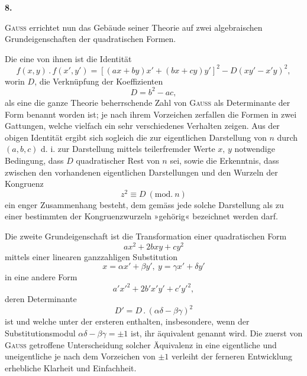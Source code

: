 \begin{center}\bfseries 8.\end{center}
\noindent\hspace*{\parindent}\textsc{Gauss} errichtet nun das Gebäude seiner Theorie auf zwei algebraischen Grundeigenschaften der quadratischen Formen.

Die eine von ihnen ist die Identität
\[
f(x,y)\mathbin{.}f(x',y')=[(ax+by)x'+(bx+cy)y']^2-D(xy'-x'y)^2,
\]
worin \(D\), die Verknüpfung der Koeffizienten
\[
D=b^2-ac,
\]
als eine die ganze Theorie beherrschende Zahl von \textsc{Gauss} als Determinante der Form benannt worden ist; je nach ihrem Vorzeichen zerfallen die Formen in zwei Gattungen, welche vielfach ein sehr verschiedenes Verhalten zeigen.
\newpage{}
\noindent Aus der obigen Identität ergibt sich sogleich die zur eigentlichen Darstellung von \(n\) durch \((a,b,c)\) d. i. zur Darstellung mittels teilerfremder Werte \(x,\,y\) notwendige Bedingung, dass \(D\) quadratischer Rest von \(n\) sei, sowie die Erkenntnis, dass zwischen den vorhandenen eigentlichen Darstellungen und den Wurzeln der Kongruenz
\[
z^2\equiv D\ (\mathrm{mod.}\ n)
\]
ein enger Zusammenhang besteht, dem gemäss jede solche Darstellung als zu einer bestimmten der Kongruenzwurzeln »gehörig« bezeichnet werden darf.

Die zweite Grundeigenschaft ist die Transformation einer quadratischen Form
\[
ax^2+2bxy+cy^2
\]
mittels einer linearen ganzzahligen Substitution
\[
x=\alpha x'+\beta y',\ y=\gamma x'+\delta y'
\]
in eine andere Form
\[
a'x'^2+2b'x'y'+c'y'^2,
\]
deren Determinante
\[
D'=D\mathbin{.}(\alpha\delta-\beta\gamma)^2
\]
ist und welche unter der ersteren enthalten, insbesondere, wenn der Substitutionsmodul \(\alpha\delta-\beta\gamma=\pm1\) ist, ihr äquivalent genannt wird. Die zuerst von \textsc{Gauss} getroffene Unterscheidung solcher Äquivalenz in eine eigentliche und uneigentliche je nach dem Vorzeichen von \(\pm1\) verleiht der ferneren Entwicklung erhebliche Klarheit und Einfachheit.


